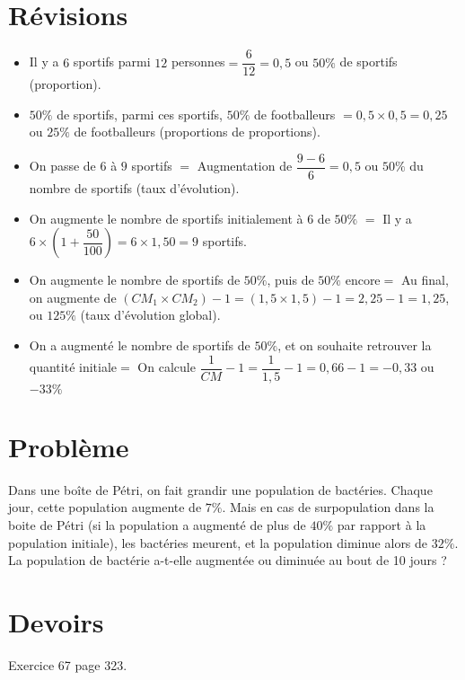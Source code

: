 \documentclass{article}
\begin{document}
\section{Révisions}
\begin{itemize}
\item \og Il y a $6$ sportifs parmi $12$ personnes\fg $= \dfrac{6}{12} = 0,5$ ou $50\%$ de sportifs (proportion). 
\item \og $50\%$ de sportifs, parmi ces sportifs, $50\%$ de footballeurs \fg $= 0,5 \times 0,5 = 0,25$ ou $25\%$ de footballeurs (proportions de proportions).
\item \og On passe de $6$ à $9$ sportifs \fg $=$ Augmentation de $\dfrac{9 - 6}{6} = 0,5$ ou $50\%$ du nombre de sportifs (taux d'évolution).
\item \og On augmente le nombre de sportifs initialement à $6$ de $50\%$ \fg $=$ Il y a $6 \times (1 + \dfrac{50}{100}) = 6 \times 1,50 = 9$ sportifs.
\item \og On augmente le nombre de sportifs de $50\%$, puis de $50\%$ encore\fg $=$ Au final, on augmente de $(CM_1 \times CM_2) - 1 = (1,5 \times 1,5) - 1 = 2,25 - 1 = 1,25$, ou $125\%$ (taux d'évolution global).
\item \og On a augmenté le nombre de sportifs de $50\%$, et on souhaite retrouver la quantité initiale\fg $=$ On calcule $\dfrac{1}{CM} - 1 = \dfrac{1}{1,5} - 1 = 0,66 - 1 = -0,33$ ou $-33\%$  
\end{itemize}

\section{Problème}

Dans une boîte de Pétri, on fait grandir une population de bactéries. Chaque jour, cette population augmente de $7\%$. Mais en cas de surpopulation dans la boite de Pétri (si la population a augmenté de plus de $40\%$ par rapport à la population initiale), les bactéries meurent, et la population diminue alors de $32\%$. La population de bactérie a-t-elle augmentée ou diminuée au bout de 10 jours ?

\section{Devoirs}

Exercice 67 page 323.
\end{document}
